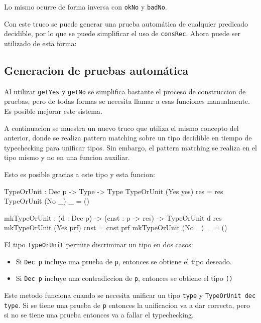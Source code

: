 Lo mismo ocurre de forma inversa con \texttt{okNo} y \texttt{badNo}.

Con este truco se puede generar una prueba automática de cualquier predicado decidible, por lo que se puede simplificar el uso de \texttt{consRec}.
Ahora puede ser utilizado de esta forma:


\subsection{Generacion de pruebas automática}

Al utilizar \texttt{getYes} y \texttt{getNo} se simplifica bastante el proceso de construccion de pruebas, pero de todas formas se necesita llamar a esas funciones manualmente. Es posible mejorar este sistema.

A continuacion se muestra un nuevo truco que utiliza el mismo concepto del anterior, donde se realiza pattern matching sobre un tipo decidible en tiempo de typechecking para unificar tipos. Sin embargo, el pattern matching se realiza en el tipo mismo y no en una funcion auxiliar.

Esto es posible gracias a este tipo y esta funcion:

\begin{code}
TypeOrUnit : Dec p -> Type -> Type
TypeOrUnit (Yes yes) res = res
TypeOrUnit (No _) _ = ()

mkTypeOrUnit : (d : Dec p) -> (cnst : p -> res) -> 
  TypeOrUnit d res
mkTypeOrUnit (Yes prf) cnst = cnst prf
mkTypeOrUnit (No _) _ = ()
\end{code}

El tipo \texttt{TypeOrUnit} permite discriminar un tipo en dos casos:
\begin{itemize}
\item Si \texttt{Dec p} incluye una prueba de \texttt{p}, entonces se obtiene el tipo deseado.
\item Si \texttt{Dec p} incluye una contradiccion de \texttt{p}, entonces se obtiene el tipo \texttt{()}
\end{itemize}

Este metodo funciona cuando se necesita unificar un tipo \texttt{type} y \texttt{TypeOrUnit dec type}. Si se tiene una prueba de \texttt{p} entonces la unificacion va a dar correcta, pero si no se tiene una prueba entonces va a fallar el typechecking.

